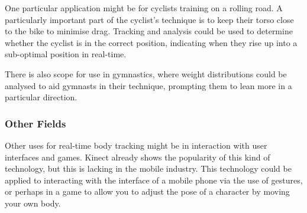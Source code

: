 One particular application might be for cyclists training on a rolling road. A particularly important part of the cyclist's technique is to keep their torso close to the bike to minimise drag. Tracking and analysis could be used to determine whether the cyclist is in the correct position, indicating when they rise up into a sub-optimal position in real-time.

There is also scope for use in gymnastics, where weight distributions could be analysed to aid gymnasts in their technique, prompting them to lean more in a particular direction.

\subsubsection{Other Fields}

Other uses for real-time body tracking might be in interaction with user interfaces and games. Kinect already shows the popularity of this kind of technology, but this is lacking in the mobile industry. This technology could be applied to interacting with the interface of a mobile phone via the use of gestures, or perhaps in a game to allow you to adjust the pose of a character by moving your own body.

